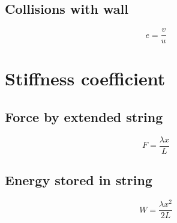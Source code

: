 \documentclass[a4paper,9pt]{scrartcl}
\begin{document}
    \subsection{Collisions with wall}

    \begin{displaymath}
        e = \frac{v}{u}
    \end{displaymath}


    \section{Stiffness coefficient}

    \subsection{Force by extended string}
    \begin{displaymath}
        F = \frac{{\lambda}x}{L}
    \end{displaymath}

    \subsection{Energy stored in string}
    \begin{displaymath}
        W = \frac{{\lambda}x^2}{2L}
    \end{displaymath}
\end{document}

